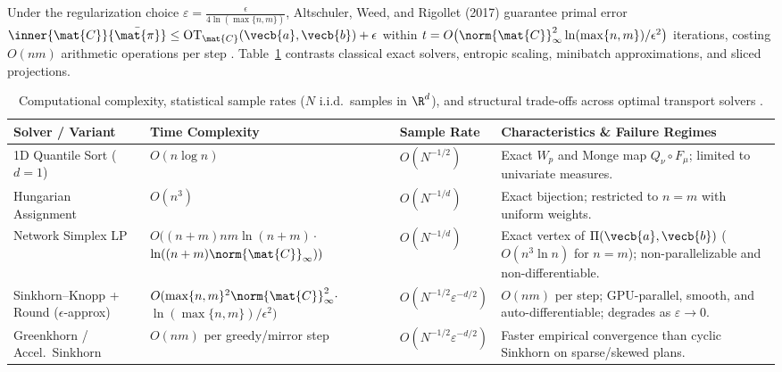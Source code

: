 \documentclass[../../../../master.tex]{subfiles}
\begin{document}
Under the regularization choice $\varepsilon = \frac{\epsilon}{4\ln(\max\{n,m\})}$, Altschuler, Weed, and Rigollet (2017) guarantee primal error $\inner{\mat{C}}{\bar{\mat{\pi}}} \le \mathrm{OT}_{\mat{C}}(\vecb{a},\vecb{b}) + \epsilon$ within $t = O\bigl(\norm{\mat{C}}_\infty^2 \ln(\max\{n,m\}) / \epsilon^2\bigr)$ iterations, costing $O(nm)$ arithmetic operations per step . Table~\ref{tab:ot:complexity} contrasts classical exact solvers, entropic scaling, minibatch approximations, and sliced projections.

\begin{table}[htbp]
\centering
\footnotesize
\setlength{\tabcolsep}{3.5pt}
\renewcommand{\arraystretch}{1.24}
\caption{Computational complexity, statistical sample rates ($N$ i.i.d.\ samples in $\R^d$), and structural trade-offs across optimal transport solvers  .}
\label{tab:ot:complexity}
\begin{tabularx}{\textwidth}{@{}>{\raggedright\arraybackslash}p{2.75cm}>{\raggedright\arraybackslash}p{4.15cm}>{\raggedright\arraybackslash}p{2.3cm}>{\raggedright\arraybackslash\hsize=1.0\hsize}X@{}}
\toprule
\textbf{Solver / Variant} & \textbf{Time Complexity} & \textbf{Sample Rate} & \textbf{Characteristics \& Failure Regimes} \\
\midrule
1D Quantile Sort ($d=1$) & $O(n \log n)$ & $O(N^{-1/2})$ & Exact $W_p$ and Monge map $Q_\nu \circ F_\mu$; limited to univariate measures. \\
Hungarian Assignment & $O(n^3)$ & $O(N^{-1/d})$ & Exact bijection; restricted to $n = m$ with uniform weights. \\
Network Simplex LP & $O((n+m)nm\ln(n+m)\cdot$ \newline $\ln((n+m)\norm{\mat{C}}_\infty))$ & $O(N^{-1/d})$ & Exact vertex of $\Pi(\vecb{a},\vecb{b})$ ($O(n^3\ln n)$ for $n=m$); non-parallelizable and non-differentiable. \\
Sinkhorn--Knopp + Round ($\epsilon$-approx) & $O(\max\{n,m\}^2 \norm{\mat{C}}_\infty^2 \cdot$ \newline $\ln(\max\{n,m\}) / \epsilon^2)$ & $O(N^{-1/2}\varepsilon^{-d/2})$ & $O(nm)$ per step; GPU-parallel, smooth, and auto-differentiable; degrades as $\varepsilon \to 0$. \\
Greenkhorn / Accel.\ Sinkhorn & $O(nm)$ per greedy/mirror step & $O(N^{-1/2}\varepsilon^{-d/2})$ & Faster empirical convergence than cyclic Sinkhorn on sparse/skewed plans. \\

\end{tabularx}
\end{table}
\end{document}

